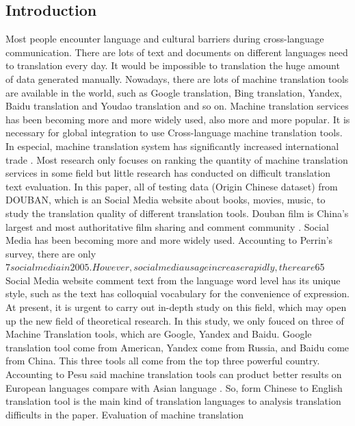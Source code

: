 \documentclass[conference]{IEEEtran}
\begin{document}
\begin{CJK*}{UTF8}{gbsn}
\section{Introduction}
Most people encounter language and cultural barriers during cross-language
communication. There are lots of text and documents on different languages need
to translation every day. It would be impossible to translation the huge amount
of data generated manually. Nowadays, there are lots of machine translation
tools are available in the world, such as Google translation, Bing translation,
Yandex, Baidu translation and Youdao translation and so on. Machine translation
services has been becoming more and more widely used, also more and more
popular. It is necessary for global integration to use Cross-language machine
translation tools. In especial, machine translation system has significantly
increased international trade \cite{brynjolfsson2018does}. Most research only
focuses on ranking the quantity of machine translation services in some field
\cite{pesu2018monte, aiken2010efficacy, koehn2006manual, somers2005round,
  shigenobu2007evaluation} but little research has conducted on difficult
translation text evaluation. In this paper, all of testing data (Origin Chinese
dataset) from DOUBAN, which is an Social Media website about books, movies,
music, to study the translation quality of different translation tools.
Douban film is China's largest and most authoritative
film sharing and comment community \cite{Douban}.
Social Media has been becoming more and more widely used.
Accounting to Perrin’s survey, there are only $7%
social media in 2005. However, social media usage increase rapidly, there are
$65%
Social Media website comment text from the language word level has its unique
style, such as the text has colloquial vocabulary for the convenience of
expression. At present, it is urgent to carry out in-depth study
on this field, which may open up the new field of theoretical research.
In this study, we only fouced on three of Machine Translation tools, which are
Google, Yandex and Baidu.
Google translation tool come from American, Yandex come from Russia, and Baidu
come from China. This three tools all come from the top three powerful country.
Accounting to Pesu said machine translation tools can product better results on
European languages compare with Asian language \cite{pesu2018monte}. So, form
Chinese to English translation tool is the main kind of translation languages to
analysis translation difficults in the paper. Evaluation of machine translation

\end{CJK*}
\end{document}

